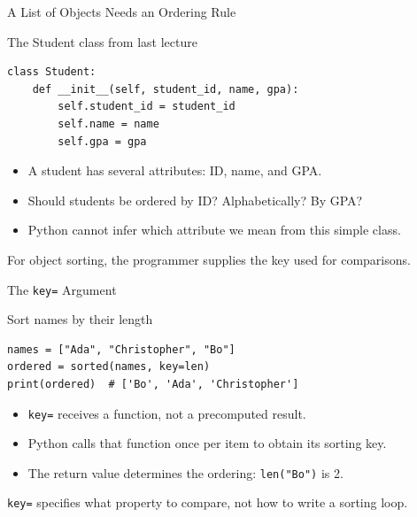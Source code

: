 \documentclass[aspectratio=169,10pt]{beamer}
\begin{document}
\begin{frame}[fragile]{A List of Objects Needs an Ordering Rule}
\small
\begin{block}{The Student class from last lecture}
\footnotesize
\begin{verbatim}
class Student:
    def __init__(self, student_id, name, gpa):
        self.student_id = student_id
        self.name = name
        self.gpa = gpa
\end{verbatim}
\end{block}
\begin{itemize}
 \item A student has several attributes: ID, name, and GPA.
 \item Should students be ordered by ID? Alphabetically? By GPA?
 \item Python cannot infer which attribute we mean from this simple class.
\end{itemize}
\begin{keyidea}For object sorting, the programmer supplies the key used for comparisons.\end{keyidea}
\end{frame}

\begin{frame}[fragile]{The \texttt{key=} Argument}
\small
\begin{block}{Sort names by their length}
\footnotesize
\begin{verbatim}
names = ["Ada", "Christopher", "Bo"]
ordered = sorted(names, key=len)
print(ordered)  # ['Bo', 'Ada', 'Christopher']
\end{verbatim}
\end{block}
\begin{itemize}
 \item \texttt{key=} receives a function, not a precomputed result.
 \item Python calls that function once per item to obtain its sorting key.
 \item The return value determines the ordering: \texttt{len("Bo")} is 2.
\end{itemize}
\begin{keyidea}\texttt{key=} specifies what property to compare, not how to write a sorting loop.\end{keyidea}
\end{frame}
\end{document}
